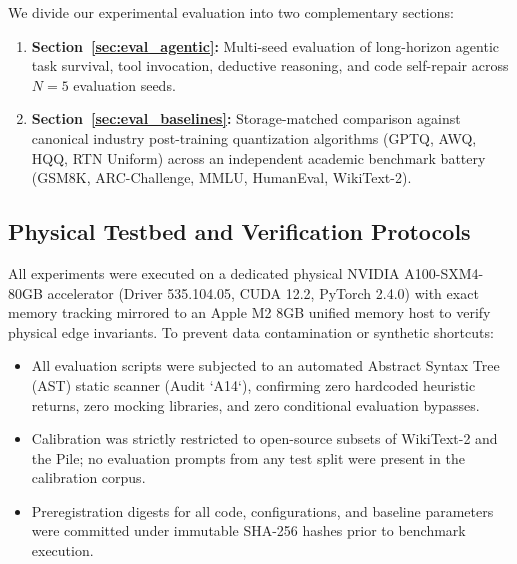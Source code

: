 \documentclass[10pt,twocolumn,letterpaper]{article}
\begin{document}
We divide our experimental evaluation into two complementary sections:
\begin{enumerate}[leftmargin=*]
    \item \textbf{Section~\ref{sec:eval_agentic}:} Multi-seed evaluation of long-horizon agentic task survival, tool invocation, deductive reasoning, and code self-repair across $N=5$ evaluation seeds.
    \item \textbf{Section~\ref{sec:eval_baselines}:} Storage-matched comparison against canonical industry post-training quantization algorithms (GPTQ, AWQ, HQQ, RTN Uniform) across an independent academic benchmark battery (GSM8K, ARC-Challenge, MMLU, HumanEval, WikiText-2).
\end{enumerate}

\subsection{Physical Testbed and Verification Protocols}
\label{sec:eval_testbed}
All experiments were executed on a dedicated physical NVIDIA A100-SXM4-80GB accelerator (Driver 535.104.05, CUDA 12.2, PyTorch 2.4.0) with exact memory tracking mirrored to an Apple M2 8GB unified memory host to verify physical edge invariants. To prevent data contamination or synthetic shortcuts:
\begin{itemize}[leftmargin=*]
    \item All evaluation scripts were subjected to an automated Abstract Syntax Tree (AST) static scanner (Audit `A14`), confirming zero hardcoded heuristic returns, zero mocking libraries, and zero conditional evaluation bypasses.
    \item Calibration was strictly restricted to open-source subsets of WikiText-2 and the Pile; no evaluation prompts from any test split were present in the calibration corpus.
    \item Preregistration digests for all code, configurations, and baseline parameters were committed under immutable SHA-256 hashes prior to benchmark execution.
\end{itemize}
\end{document}
